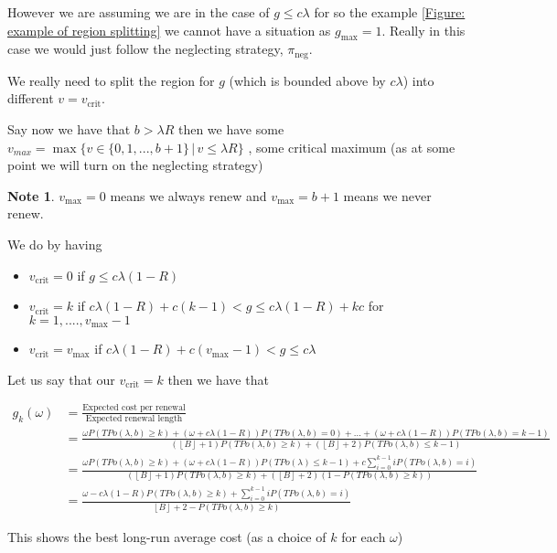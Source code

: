 \documentclass[a4paper,10pt]{article}
\newcommand{\floor}[1]{\left \lfloor #1 \right \rfloor}
\theoremstyle{definition}
\theoremstyle{definition}
\theoremstyle{remark}
\theoremstyle{definition}
\newtheorem*{note}{Note}
\begin{document}
However we are assuming we are in the case of $g \leq c \lambda$ for so the example \ref{Figure: example of region splitting} we cannot have a situation as $g_{\text{max}}=1$. Really in this case we would just follow the neglecting strategy, $\pi_{\text{neg}}$.

We really need to split the region for $g$ (which is bounded above by $c \lambda$) into different $v=v_{\text{crit}}$.

Say now we have that $b > \lambda R $ then we have some $v_{max}=\max \{ v \in \{ 0,1,...,b+1 \} \, | \, v \leq \lambda R \}$ , some critical maximum (as at some point we will turn on the neglecting strategy)

\begin{note}
$v_{\text{max}}=0$ means we always renew and $v_{\text{max}}=b+1$ means we never renew.
\end{note}

We do by having
\begin{itemize}
\item $v_{\text{crit}}=0$ if $g \leq c \lambda (1-R)$
\item $v_{\text{crit}}=k$ if $c \lambda (1-R) +c(k-1) < g \leq c \lambda (1-R)+ kc$ for $k=1,....,v_{\text{max}}-1$
\item $v_{\text{crit}}=v_{\text{max}}$ if $c \lambda (1-R) + c(v_{\text{max}}-1) < g \leq c \lambda$
\end{itemize}

Let us say that our $v_{\text{crit}}=k$ then we have that

\begin{align*}
g_{k}(\omega)&=\frac{\text{Expected cost per renewal}}{\text{Expected renewal length}} \\
&= \frac{\omega P(TPo(\lambda,b) \geq k) + (\omega + c \lambda (1-R )) P(TPo(\lambda,b)=0)+...+(\omega + c \lambda (1-R)) P(TPo(\lambda,b)=k-1)}{(\floor{B}+1)P(TPo(\lambda,b) \geq k) + (\floor{B}+2)P(TPo(\lambda,b) \leq k-1)} \\
&=\frac{\omega P(TPo(\lambda,b) \geq k) + (\omega + c \lambda (1-R))P(TPo(\lambda) \leq k-1) + c \sum\limits_{i=0}^{k-1} i P(TPo(\lambda,b)=i)}{(\floor{B}+1)P(TPo(\lambda,b) \geq k) + (\floor{B}+2)(1-P(TPo(\lambda,b) \geq k))} \\
&= \frac{\omega - c \lambda (1-R) P(TPo(\lambda,b) \geq k) +  \sum\limits_{i=0}^{k-1} i P(TPo(\lambda,b)=i)}{\floor{B}+2-P(TPo(\lambda,b) \geq k)}
\end{align*}

\begin{myfigure}
\begin{center}
\resizebox{.6\textwidth}{!}{
}
\end{center}
\caption{This shows the best long-run average cost (as a choice of $k$ for each $\omega$)}
\end{myfigure}
\end{document}
